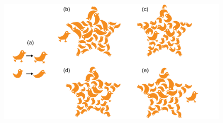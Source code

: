 \begin{figure}
\centering
\includegraphics[width=1.0\textwidth]{figures/animationpak/birb_entering_star.pdf} 
\caption[An loose bird enters a packing of smaller birds inside a star]
{\label{fig_bib_entering_star} 
}
\end{figure}

